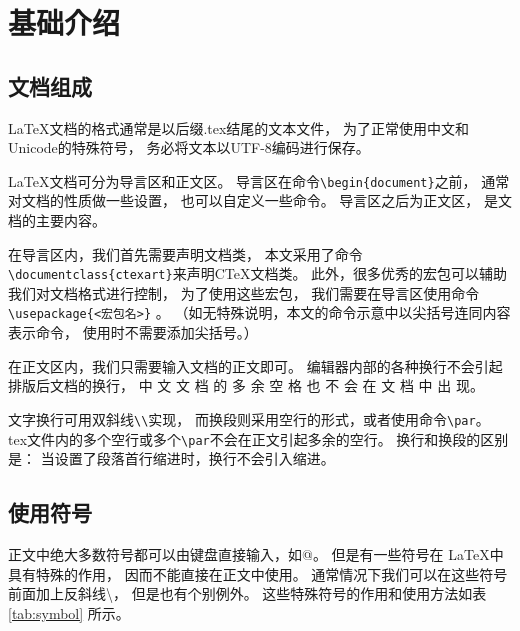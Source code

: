 \documentclass[UTF8]{ctexart}
\numberwithin{equation}{section}			%
\begin{document}
    \section{基础介绍}
    \subsection{文档组成}
    \LaTeX 文档的格式通常是以后缀.tex结尾的文本文件，
    为了正常使用中文和Unicode的特殊符号，
    务必将文本以UTF-8编码进行保存。
    
    \LaTeX 文档可分为导言区和正文区。
    导言区在命令\verb|\begin{document}|之前，
    通常对文档的性质做一些设置，
    也可以自定义一些命令。
    导言区之后为正文区，
    是文档的主要内容。
    
    在导言区内，我们首先需要声明文档类，
    本文采用了命令\verb|\documentclass{ctexart}|来声明C\TeX 文档类。
    此外，很多优秀的宏包可以辅助我们对文档格式进行控制，
    为了使用这些宏包，
    我们需要在导言区使用命令\verb|\usepackage{<宏包名>}| 。
    （如无特殊说明，本文的命令示意中以尖括号连同内容表示命令，
    使用时不需要添加尖括号。）
    
    在正文区内，我们只需要输入文档的正文即可。
    编辑器内部的各种换行不会引起排版后文档的换行，
    中 文 文 档 的 多 余 空 格 也 不 会 在 文 档 中 出 现。 \par
    文字换行可用双斜线\verb|\\|实现，
    而换段则采用空行的形式，或者使用命令\verb|\par|。
    tex文件内的多个空行或多个\verb|\par|不会在正文引起多余的空行。
    换行和换段的区别是：
    当设置了段落首行缩进时，换行不会引入缩进。
    
    \subsection{使用符号}
    正文中绝大多数符号都可以由键盘直接输入，如@。
    但是有一些符号在 \LaTeX 中具有特殊的作用，
    因而不能直接在正文中使用。
    通常情况下我们可以在这些符号前面加上反斜线\textbackslash，
    但是也有个别例外。
    这些特殊符号的作用和使用方法如表 \ref{tab:symbol} 所示。
    
\end{document}
